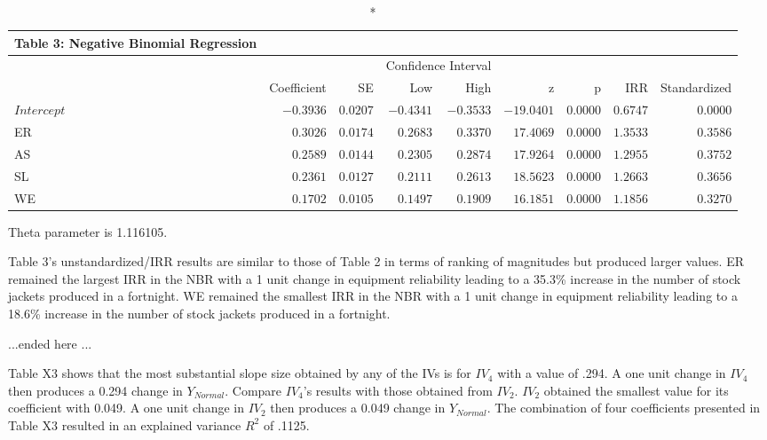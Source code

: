 \documentclass[ShortAfour,times,sageapa]{sagej}
\begin{document}
\setlength{\LTpost}{1mm}
\begin{longtable}{l|rrrrrrrr}
	\caption*{
		{\large Table 3: Negative Binomial Regression}
	} \\ 
	\toprule
	\multicolumn{1}{l}{} &  &  & \multicolumn{2}{c}{Confidence Interval} &  &  &  &  \\ 
	\cmidrule(lr){4-5}
	\multicolumn{1}{l}{} & Coefficient & SE & Low & High & z & p & IRR & Standardized \\ 
	\midrule
	\(Intercept\) & $-0.3936$ & $0.0207$ & $-0.4341$ & $-0.3533$ & $-19.0401$ & $0.0000$ & $0.6747$ & $0.0000$ \\ 
	ER & $0.3026$ & $0.0174$ & $0.2683$ & $0.3370$ & $17.4069$ & $0.0000$ & $1.3533$ & $0.3586$ \\ 
	AS & $0.2589$ & $0.0144$ & $0.2305$ & $0.2874$ & $17.9264$ & $0.0000$ & $1.2955$ & $0.3752$ \\ 
	SL & $0.2361$ & $0.0127$ & $0.2111$ & $0.2613$ & $18.5623$ & $0.0000$ & $1.2663$ & $0.3656$ \\ 
	WE & $0.1702$ & $0.0105$ & $0.1497$ & $0.1909$ & $16.1851$ & $0.0000$ & $1.1856$ & $0.3270$ \\ 
	\bottomrule
\end{longtable}
\begin{minipage}{\linewidth}
	Theta parameter is 1.116105.\\
\end{minipage}

	Table 3's unstandardized/IRR results are similar to those of Table 2 in terms of ranking of magnitudes but produced larger values.
	ER remained the largest IRR in the NBR with a 1 unit change in equipment reliability leading to a 35.3\% increase in the number of stock jackets produced in a fortnight.
	WE remained the smallest IRR in the NBR with a 1 unit change in equipment reliability leading to a 18.6\% increase in the number of stock jackets produced in a fortnight.
	
	...ended here ...
	
	
	Table X3 shows that the most substantial slope size obtained by any of the IVs is for $IV_4$ with a value of .294.  
	A one unit change in $IV_4$ then produces a 0.294 change in $Y_{Normal}$.
	Compare $IV_4$'s results with those obtained from $IV_2$.
	$IV_2$ obtained the smallest value for its coefficient with 0.049.
	A one unit change in $IV_2$ then produces a 0.049 change in $Y_{Normal}$.	
	The combination of four coefficients presented in Table X3 resulted in an explained variance $R^2$ of .1125.
	
\end{document}

